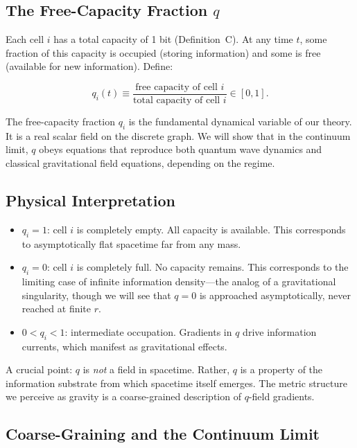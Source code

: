 \documentclass[aps,prd,twocolumn,showpacs,superscriptaddress,preprintnumbers]{revtex4-2}
\begin{document}
\subsection{The Free-Capacity Fraction $q$}

Each cell $i$ has a total capacity of 1 bit (Definition~C).
At any time $t$, some fraction of this capacity is occupied (storing information) and some is free (available for new information).
Define:

\begin{equation}
q_i(t) \equiv \frac{\text{free capacity of cell } i}{\text{total capacity of cell } i} \in [0, 1].
\label{eq:qdef}
\end{equation}

The free-capacity fraction $q_i$ is the fundamental dynamical variable of our theory.
It is a real scalar field on the discrete graph.
We will show that in the continuum limit, $q$ obeys equations that reproduce both quantum wave dynamics and classical gravitational field equations, depending on the regime.

\subsection{Physical Interpretation}

\begin{itemize}
    \item $q_i = 1$: cell $i$ is completely empty. All capacity is available. This corresponds to asymptotically flat spacetime far from any mass.
    \item $q_i = 0$: cell $i$ is completely full. No capacity remains. This corresponds to the limiting case of infinite information density---the analog of a gravitational singularity, though we will see that $q=0$ is approached asymptotically, never reached at finite $r$.
    \item $0 < q_i < 1$: intermediate occupation. Gradients in $q$ drive information currents, which manifest as gravitational effects.
\end{itemize}

A crucial point: $q$ is \emph{not} a field in spacetime.
Rather, $q$ is a property of the information substrate from which spacetime itself emerges.
The metric structure we perceive as gravity is a coarse-grained description of $q$-field gradients.

\subsection{Coarse-Graining and the Continuum Limit}
\end{document}
